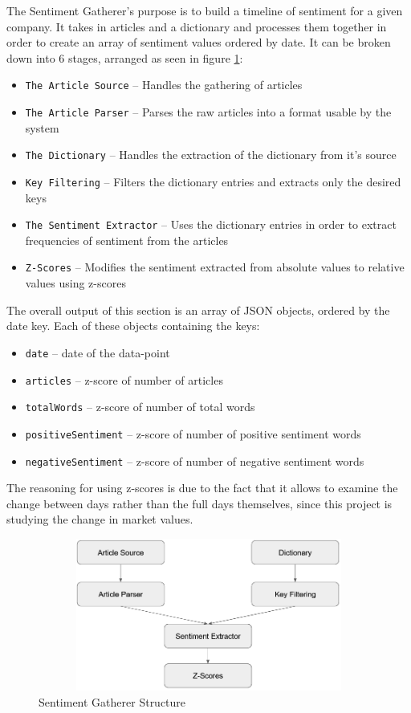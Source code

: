 The Sentiment Gatherer's purpose is to build a timeline of sentiment for a given company. It takes in articles and a dictionary and processes them together in order to create an array of sentiment values ordered by date. It can be broken down into 6 stages, arranged as seen in figure \ref{fig:sentimentgathererstructure}:
\begin{itemize}
    \item \texttt{The Article Source} -- Handles the gathering of articles
    \item \texttt{The Article Parser} -- Parses the raw articles into a format usable by the system
    \item \texttt{The Dictionary} -- Handles the extraction of the dictionary from it's source
    \item \texttt{Key Filtering} -- Filters the dictionary entries and extracts only the desired keys
    \item \texttt{The Sentiment Extractor} -- Uses the dictionary entries in order to extract frequencies of sentiment from the articles
    \item \texttt{Z-Scores} -- Modifies the sentiment extracted from absolute values to relative values using z-scores
\end{itemize}

The overall output of this section is an array of JSON objects, ordered by the date key. Each of these objects containing the keys:
\begin{itemize}
    \item \texttt{date} -- date of the data-point
    \item \texttt{articles} -- z-score of number of articles
    \item \texttt{totalWords} -- z-score of number of total words
    \item \texttt{positiveSentiment} -- z-score of number of positive sentiment words
    \item \texttt{negativeSentiment} -- z-score of number of negative sentiment words
\end{itemize}
The reasoning for using z-scores is due to the fact that it allows to examine the change between days rather than the full days themselves, since this project is studying the change in market values.

\begin{figure}[h]
    \centering
    \includegraphics[width=15cm,height=5cm,keepaspectratio]{design/SentimentGathererStructure.png}
    \caption{Sentiment Gatherer Structure}
    \label{fig:sentimentgathererstructure}
\end{figure}


